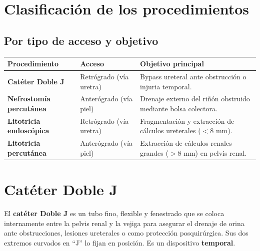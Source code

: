 \section*{Clasificación de los procedimientos}

\subsection*{Por tipo de acceso y objetivo}

{\renewcommand{\arraystretch}{1.35}
\begin{center}
\begin{tabular}{>{\bfseries}p{3.5cm} p{4.5cm} p{6cm}}
\hline
Procedimiento & Acceso & Objetivo principal \\
\hline
Catéter Doble J & Retrógrado (vía uretra) & Bypass ureteral ante obstrucción o injuria temporal. \\[0.5em]
\hline
Nefrostomía percutánea & Anterógrado (vía piel) & Drenaje externo del riñón obstruido mediante bolsa colectora. \\[0.5em]
\hline
Litotricia endoscópica & Retrógrado (vía uretra) & Fragmentación y extracción de cálculos ureterales ($<$8 mm). \\[0.5em]
\hline
Litotricia percutánea & Anterógrado (vía piel) & Extracción de cálculos renales grandes ($>$8 mm) en pelvis renal. \\
\hline
\end{tabular}
\end{center}

\clearpage

\section*{Catéter Doble J}

\begin{cajadefinicion}
El \textbf{catéter Doble J} es un tubo fino, flexible y fenestrado que se coloca internamente entre la pelvis renal y la vejiga para asegurar el drenaje de orina ante obstrucciones, lesiones ureterales o como protección posquirúrgica. Sus dos extremos curvados en ``J'' lo fijan en posición. Es un dispositivo \textbf{temporal}.
\end{cajadefinicion}


}
